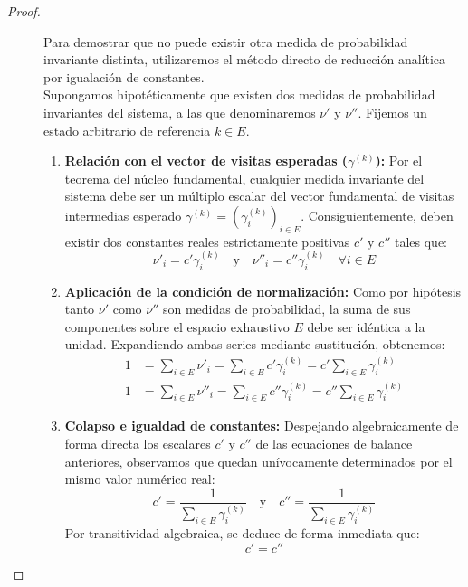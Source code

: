 \begin{coro}
\begin{proof}
\begin{description}
    \item[] Para demostrar que no puede existir otra medida de probabilidad invariante distinta, utilizaremos el método directo de reducción analítica por igualación de constantes. \\

    \noindent
    Supongamos hipotéticamente que existen dos medidas de probabilidad invariantes del sistema, a las que denominaremos $\nu'$ y $\nu''$. Fijemos un estado arbitrario de referencia $k \in E$.

    \begin{enumerate}
        \item \textbf{Relación con el vector de visitas esperadas ($\gamma^{(k)}$):}
        Por el teorema del núcleo fundamental, cualquier medida invariante del sistema debe ser un múltiplo escalar del vector fundamental de visitas intermedias esperado $\gamma^{(k)} = (\gamma_i^{(k)})_{i \in E}$. Consiguientemente, deben existir dos constantes reales estrictamente positivas $c'$ y $c''$ tales que:
        \[
        \nu'_i = c' \gamma_i^{(k)} \quad \text{y} \quad \nu''_i = c'' \gamma_i^{(k)} \quad \forall i \in E
        \]
        
        \item \textbf{Aplicación de la condición de normalización:}
        Como por hipótesis tanto $\nu'$ como $\nu''$ son medidas de probabilidad, la suma de sus componentes sobre el espacio exhaustivo $E$ debe ser idéntica a la unidad. Expandiendo ambas series mediante sustitución, obtenemos:
        \begin{align*}
            1 &= \sum_{i \in E} \nu'_i = \sum_{i \in E} c' \gamma_i^{(k)} = c' \sum_{i \in E} \gamma_i^{(k)} \\
            1 &= \sum_{i \in E} \nu''_i = \sum_{i \in E} c'' \gamma_i^{(k)} = c'' \sum_{i \in E} \gamma_i^{(k)}
        \end{align*}
        
        \item \textbf{Colapso e igualdad de constantes:}
        Despejando algebraicamente de forma directa los escalares $c'$ y $c''$ de las ecuaciones de balance anteriores, observamos que quedan unívocamente determinados por el mismo valor numérico real:
        \[
        c' = \frac{1}{\sum_{i \in E} \gamma_i^{(k)}} \quad \text{y} \quad c'' = \frac{1}{\sum_{i \in E} \gamma_i^{(k)}}
        \]
        Por transitividad algebraica, se deduce de forma inmediata que:
        \[
        c' = c''
        \]
        

\end{enumerate}
\end{description}
\end{proof}
\end{coro}
